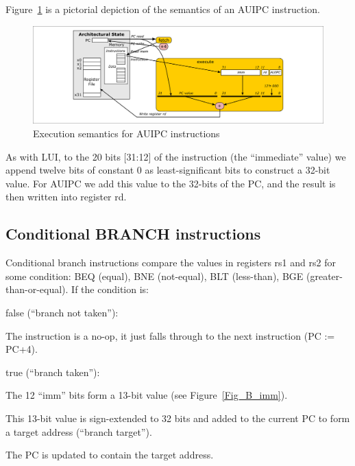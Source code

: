 Figure~\ref{Fig_AUIPC} is a pictorial depiction of the semantics of an AUIPC instruction.
\begin{figure}[htbp]
  \centerline{\includegraphics[width=6in,angle=0]{Figures/Fig_AUIPC}}
  \caption{\label{Fig_AUIPC} Execution semantics for AUIPC instructions}
\end{figure}
As with LUI, to the 20 bits [31:12] of the instruction (the
``immediate'' value) we append twelve bits of constant 0 as
least-significant bits to construct a 32-bit value.  For AUIPC we add
this value to the 32-bits of the PC, and the result is then written
into register rd.


\subsection{Conditional BRANCH instructions}

Conditional branch instructions compare the values in registers rs1
and rs2 for some condition: BEQ (equal), BNE (not-equal), BLT
(less-than), BGE (greater-than-or-equal).  If the condition is:

\begin{tightlist}

  \item false (``branch not taken''):

    \begin{tightlist}
      \item The instruction is a no-op, it just falls through to the
            next instruction (PC := PC+4).
    \end{tightlist}

  \item true (``branch taken''):

    \begin{tightlist}
      \item The 12 ``imm'' bits form a 13-bit value (see
            Figure~\ref{Fig_B_imm}).

      \item This 13-bit value is sign-extended to 32 bits and added to
            the current PC to form a target address (``branch
            target'').
            
      \item The PC is updated to contain the target address.
    \end{tightlist}

\end{tightlist}

